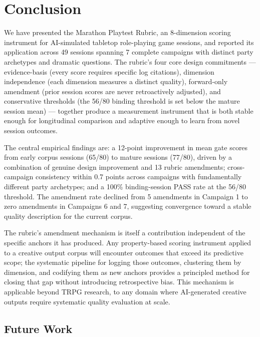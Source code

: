 
\section{Conclusion}
\label{sec:conclusion}

We have presented the Marathon Playtest Rubric, an 8-dimension scoring instrument for
AI-simulated tabletop role-playing game sessions, and reported its application across
49 sessions spanning 7 complete campaigns with distinct party archetypes and dramatic
questions. The rubric's four core design commitments --- evidence-basis (every score
requires specific log citations), dimension independence (each dimension measures a
distinct quality), forward-only amendment (prior session scores are never retroactively
adjusted), and conservative thresholds (the 56/80 binding threshold is set below the
mature session mean) --- together produce a measurement instrument that is both stable
enough for longitudinal comparison and adaptive enough to learn from novel session
outcomes.

The central empirical findings are: a 12-point improvement in mean gate scores from
early corpus sessions (65/80) to mature sessions (77/80), driven by a combination of
genuine design improvement and 13 rubric amendments; cross-campaign consistency within
0.7 points across campaigns with fundamentally different party archetypes; and a
100\% binding-session PASS rate at the 56/80 threshold. The amendment rate declined
from 5 amendments in Campaign 1 to zero amendments in Campaigns 6 and 7, suggesting
convergence toward a stable quality description for the current corpus.

The rubric's amendment mechanism is itself a contribution independent of the specific
anchors it has produced. Any property-based scoring instrument applied to a creative
output corpus will encounter outcomes that exceed its predictive scope; the systematic
pipeline for logging those outcomes, clustering them by dimension, and codifying them
as new anchors provides a principled method for closing that gap without introducing
retrospective bias. This mechanism is applicable beyond TRPG research, to any domain
where AI-generated creative outputs require systematic quality evaluation at scale.

\subsection{Future Work}

